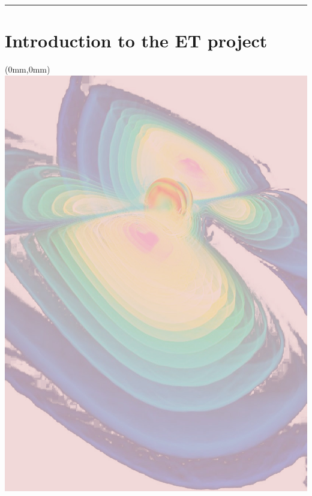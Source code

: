 \documentclass[color,DIV12,pdftex,a4paper]{ET-DS}
\begin{document}
\setcounter{page}{4}
%
{\setlength{\baselineskip}{0pt} \tableofcontents}
\vspace{1cm}
\hrule height 1pt


\citeindextrue
\cleardoublepage  
\cleardoublepage  
\FloatBarrier
\section{Introduction to the ET project}

%
\cleardoublepage
\FloatBarrier
\begin{textblock*}{297mm}(0mm,0mm)   \includegraphics[width=\paperwidth]{Sec_ET_ScienceCase/BackgroundFirstPageScienceCase.jpg}
\end{textblock*}
\end{document}
